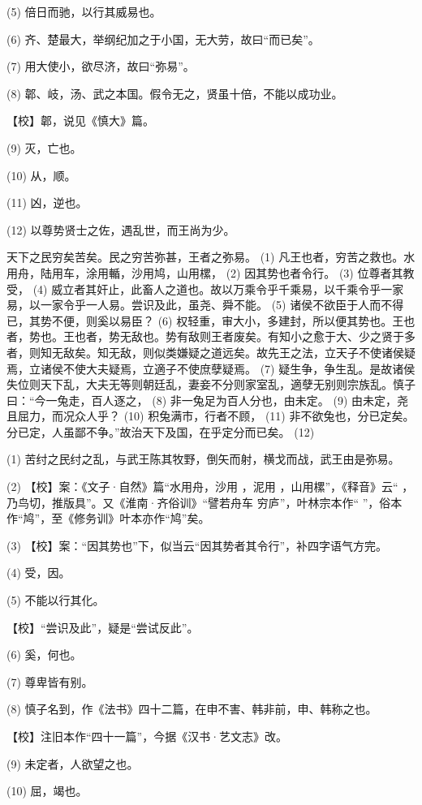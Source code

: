 \documentclass[12pt,UTF8]{ctexbook}
\begin{document}
(5) 倍日而驰，以行其威易也。

(6) 齐、楚最大，举纲纪加之于小国，无大劳，故曰“而已矣”。

(7) 用大使小，欲尽济，故曰“弥易”。

(8) 郼、岐，汤、武之本国。假令无之，贤虽十倍，不能以成功业。

【校】郼，说见《慎大》篇。

(9) 灭，亡也。

(10) 从，顺。

(11) 凶，逆也。

(12) 以尊势贤士之佐，遇乱世，而王尚为少。

天下之民穷矣苦矣。民之穷苦弥甚，王者之弥易。 (1) 凡王也者，穷苦之救也。水用舟，陆用车，涂用輴，沙用鸠，山用樏， (2) 因其势也者令行。 (3) 位尊者其教受， (4) 威立者其奸止，此畜人之道也。故以万乘令乎千乘易，以千乘令乎一家易，以一家令乎一人易。尝识及此，虽尧、舜不能。 (5) 诸侯不欲臣于人而不得已，其势不便，则奚以易臣？ (6) 权轻重，审大小，多建封，所以便其势也。王也者，势也。王也者，势无敌也。势有敌则王者废矣。有知小之愈于大、少之贤于多者，则知无敌矣。知无敌，则似类嫌疑之道远矣。故先王之法，立天子不使诸侯疑焉，立诸侯不使大夫疑焉，立適子不使庶孽疑焉。 (7) 疑生争，争生乱。是故诸侯失位则天下乱，大夫无等则朝廷乱，妻妾不分则家室乱，適孽无别则宗族乱。慎子曰：“今一兔走，百人逐之， (8) 非一兔足为百人分也，由未定。 (9) 由未定，尧且屈力，而况众人乎？ (10) 积兔满市，行者不顾， (11) 非不欲兔也，分已定矣。分已定，人虽鄙不争。”故治天下及国，在乎定分而已矣。 (12)

(1) 苦纣之民纣之乱，与武王陈其牧野，倒矢而射，横戈而战，武王由是弥易。

(2) 【校】案：《文子·自然》篇“水用舟，沙用 ，泥用 ，山用樏”，《释音》云“ ，乃鸟切，推版具”。又《淮南·齐俗训》“譬若舟车 穷庐”，叶林宗本作“ ”，俗本作“鸠”，至《修务训》叶本亦作“鸠”矣。

(3) 【校】案：“因其势也”下，似当云“因其势者其令行”，补四字语气方完。

(4) 受，因。

(5) 不能以行其化。

【校】“尝识及此”，疑是“尝试反此”。

(6) 奚，何也。

(7) 尊卑皆有别。

(8) 慎子名到，作《法书》四十二篇，在申不害、韩非前，申、韩称之也。

【校】注旧本作“四十一篇”，今据《汉书·艺文志》改。

(9) 未定者，人欲望之也。

(10) 屈，竭也。
\end{document}
